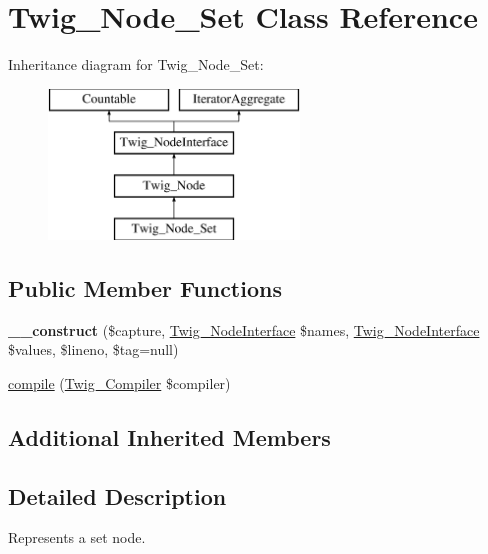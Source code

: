 \hypertarget{class_twig___node___set}{}\section{Twig\+\_\+\+Node\+\_\+\+Set Class Reference}
\label{class_twig___node___set}
Inheritance diagram for Twig\+\_\+\+Node\+\_\+\+Set\+:\begin{figure}[H]
\begin{center}
\leavevmode
\includegraphics[height=4.000000cm]{class_twig___node___set}
\end{center}
\end{figure}
\subsection*{Public Member Functions}
\begin{DoxyCompactItemize}
\item 
\hypertarget{class_twig___node___set_ad851d347886be52ca99a7d40f7043811}{}{\bfseries \+\_\+\+\_\+construct} (\$capture, \hyperlink{interface_twig___node_interface}{Twig\+\_\+\+Node\+Interface} \$names, \hyperlink{interface_twig___node_interface}{Twig\+\_\+\+Node\+Interface} \$values, \$lineno, \$tag=null)\label{class_twig___node___set_ad851d347886be52ca99a7d40f7043811}

\item 
\hyperlink{class_twig___node___set_a4e0faa87c3fae583620b84d3607085da}{compile} (\hyperlink{class_twig___compiler}{Twig\+\_\+\+Compiler} \$compiler)
\end{DoxyCompactItemize}
\subsection*{Additional Inherited Members}


\subsection{Detailed Description}
Represents a set node.

